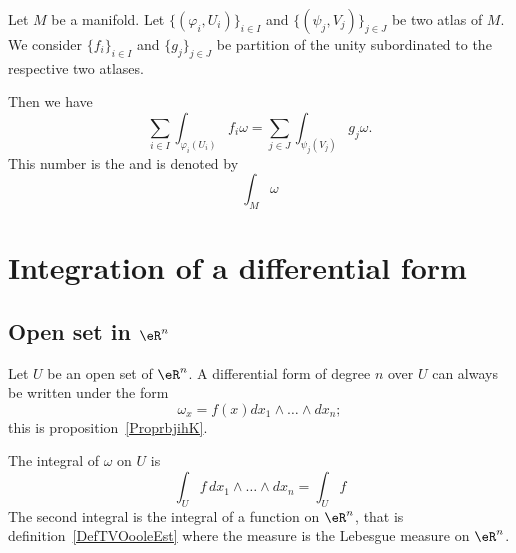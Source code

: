 \begin{propositionDef}       \label{DEFooOMQLooGiJWZS}

	Let \( M\) be a manifold. Let \(  \{ (\varphi_i,U_i) \}_{i\in I}\) and \( \{ (\psi_j,V_j) \}_{j\in J}\) be two atlas of \( M\). We consider \( \{ f_i \}_{i\in I}\) and \( \{ g_j \}_{j\in J}\) be partition of the unity subordinated to the respective two atlases.

	Then we have
	\begin{equation}
		\sum_{i\in I}\int_{\varphi_i(U_i)}f_i\omega=\sum_{j\in J}\int_{\psi_j(V_j)}g_j\omega.
	\end{equation}
	This number is the  and is denoted by
	\begin{equation}
		\int_M\omega
	\end{equation}
\end{propositionDef}


\section{Integration of a differential form}

\subsection{Open set in \( \eR^n\)}

Let \( U\) be an open set of \( \eR^n\). A differential form of degree \( n\) over \( U\) can always be written under the form
\begin{equation}
	\omega_x=f(x)dx_1\wedge\ldots\wedge dx_n;
\end{equation}
this is proposition~\ref{ProprbjihK}.

\begin{definition}      \label{DEFooEYRFooRQTmRF}
	The integral of \( \omega\) on \( U\) is
	\begin{equation}
		\int_{U}f\,dx_1\wedge\ldots\wedge dx_n=\int_Uf
	\end{equation}
	The second integral is the integral of a function on \( \eR^n\), that is definition~\ref{DefTVOooleEst} where the measure is the Lebesgue measure on \( \eR^n\).
\end{definition}

